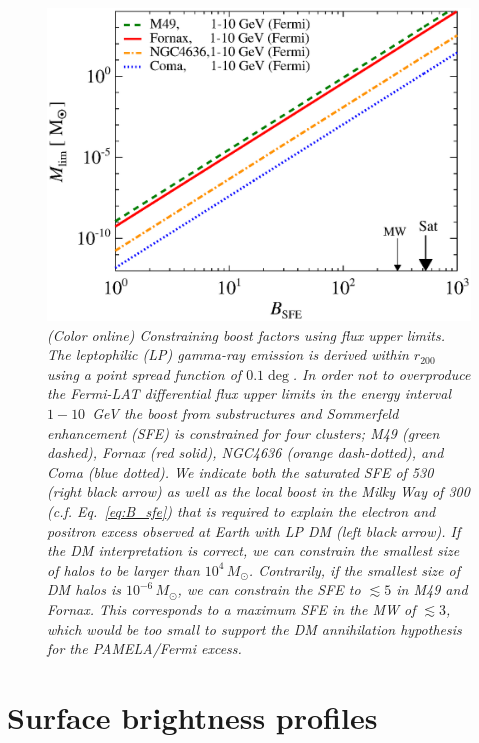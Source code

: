\documentclass[10pt,aps,pra,reprint,amsmath,amsfonts,amssymb,showpacs,nofootinbib,floatfix]{revtex4-1}
\newcommand{\Fermi}{{\em Fermi}\xspace}
\newcommand{\msun}{M_\odot}
\newcommand{\rvir}{r_{200}}
\begin{document}
\begin{figure}%
 \includegraphics[width=0.99\columnwidth]{figures/LP.const.diff.v14.0.1deg.1.6T.SubMass.SF700.IR2.noMW.woGal.bw.eps}
 \caption{\it (Color online) Constraining boost factors using flux
   upper limits. The leptophilic (LP) gamma-ray emission is derived
   within $\rvir$ using a point spread function of $0.1\deg$. In order
   not to overproduce the \Fermi-LAT differential flux upper limits in
   the energy interval $1-10$~GeV the boost from substructures and
   Sommerfeld enhancement (SFE) is constrained for four clusters; M49
   (green dashed), Fornax (red solid), NGC4636 (orange dash-dotted),
   and Coma (blue dotted). We indicate both the saturated SFE of 530
   (right black arrow) as well as the local boost in the Milky Way of
   300 (c.f. Eq.~\ref{eq:B_sfe}) that is required to explain the
   electron and positron excess observed at Earth with LP DM (left
   black arrow). If the DM interpretation is correct, we can constrain
   the smallest size of halos to be larger than
   $10^4\,\msun$. Contrarily, if the smallest size of DM halos is
   $10^{-6}\,\msun$, we can constrain the SFE to $\lesssim 5$ in M49
   and Fornax. This corresponds to a maximum SFE in the MW of
   $\lesssim 3$, which would be too small to support the DM
   annihilation hypothesis for the PAMELA/\Fermi excess.}
 \label{fig:boost_const}
\end{figure}


\section{Surface brightness profiles}
\label{sect:spatial}
\end{document}
